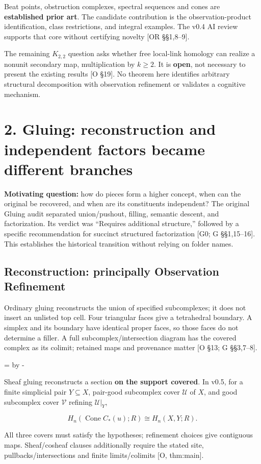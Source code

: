 \documentclass[10pt,letterpaper]{article}
\newcommand{\NeedDisplaySpace}{\par\begingroup\dimen0=\pagegoal\advance\dimen0 by -\pagetotal\ifdim\dimen0<8\baselineskip\newpage\fi\endgroup}
\begin{document}
Beat points, obstruction complexes, spectral sequences and cones are \textbf{established prior art}. The candidate contribution is the observation-product identification, class restrictions, and integral examples. The v0.4 AI review supports that core without certifying novelty [OR \S{}\S{}1,8--9].\par

The remaining \(K_{2,2}\) question asks whether free local-link homology can realize a nonunit secondary map, multiplication by \(k\ge2\). It is \textbf{open}, not necessary to present the existing results [O \S{}19]. No theorem here identifies arbitrary structural decomposition with observation refinement or validates a cognitive mechanism.\par

\section*{2. Gluing: reconstruction and independent factors became different branches}

\textbf{Motivating question:} how do pieces form a higher concept, when can the original be recovered, and when are its constituents independent? The original Gluing audit separated union/pushout, filling, semantic descent, and factorization. Its verdict was ``Requires additional structure,'' followed by a specific recommendation for succinct structured factorization [G0; G \S{}\S{}1,15--16]. This establishes the historical transition without relying on folder names.\par

\subsection*{Reconstruction: principally Observation Refinement}

Ordinary gluing reconstructs the union of specified subcomplexes; it does not insert an unlisted top cell. Four triangular faces give a tetrahedral boundary. A simplex and its boundary have identical proper faces, so those faces do not determine a filler. A full subcomplex/intersection diagram has the covered complex as its colimit; retained maps and provenance matter [O \S{}13; G \S{}\S{}3,7--8].\par

\NeedDisplaySpace
\begin{samepage}
Sheaf gluing reconstructs a section \textbf{on the support covered}. In v0.5, for a finite simplicial pair \(Y\subseteq X\), pair-good subcomplex cover \(\mathcal U\) of \(X\), and good subcomplex cover \(\mathcal V\) refining \(\mathcal U|_Y\),\par
\[
H_n(\operatorname{Cone}C_*(u);R)\cong H_n(X,Y;R).
\]
\end{samepage}
All three covers must satisfy the hypotheses; refinement choices give contiguous maps. Sheaf/cosheaf clauses additionally require the stated site, pullbacks/intersections and finite limits/colimits [O, thm:main].\par
\end{document}
